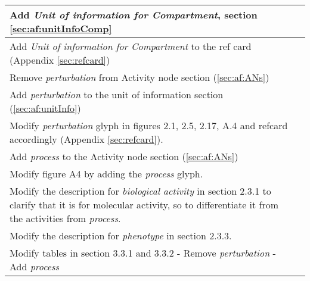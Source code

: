 \begin{center}
\label{tab:revision history}
\tablelasttail{\hline}
\begin{supertabular}{|p{12cm}|c|}\hline
Add \emph{Unit of information for Compartment}, section \ref{sec:af:unitInfoComp} & \\\hline
Add \emph{Unit of information for Compartment} to the ref card (Appendix \ref{sec:refcard}) & \\\hline
Remove \emph{perturbation} from Activity node section (\ref{sec:af:ANs}) & \\\hline
Add \emph{perturbation} to the unit of information section (\ref{sec:af:unitInfo}) & \\\hline
Modify \emph{perturbation} glyph in figures 2.1, 2.5, 2.17, A.4 and refcard accordingly (Appendix \ref{sec:refcard}). & \\\hline
Add \emph{process} to the Activity node section (\ref{sec:af:ANs})  & \\\hline
Modify figure A4 by adding the \emph{process} glyph.  & \\\hline
Modify the description for \emph{biological activity} in section 2.3.1 to clarify that it is for molecular activity, so to differentiate it from the activities from \emph{process}.  & \\\hline
Modify the description for \emph{phenotype} in section 2.3.3.  & \\\hline
Modify tables in section 3.3.1 and 3.3.2 
- Remove \emph{perturbation} 
- Add \emph{process} & \\\hline


\end{supertabular}
\end{center}

